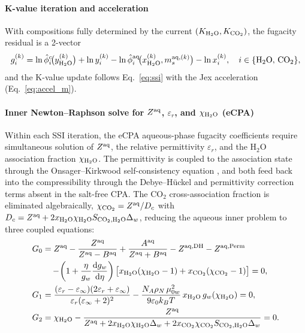 \documentclass[preprint,12pt,number]{elsarticle}
\begin{document}
\paragraph{K-value iteration and acceleration}
With compositions fully determined by the current $(K_{\rm H_2O}, K_{\rm CO_2})$, the fugacity
residual is a 2-vector
\begin{equation}
  g_i^{(k)} =
    \ln\hat{\phi}_i^{c}\!\bigl(y_{\rm H_2O}^{(k)}\bigr) + \ln y_i^{(k)}
    - \ln\hat{\phi}_i^{\rm aq}\!\bigl(x_{\rm H_2O}^{(k)}, m_s^{{\rm aq},(k)}\bigr) - \ln x_i^{(k)},
    \quad i \in \{\mathrm{H}_2\mathrm{O},\,\mathrm{CO}_2\},
  \label{eq:g_kv}
\end{equation}
and the K-value update follows Eq.~\eqref{eq:ssi} with the Jex acceleration
(Eq.~\eqref{eq:accel_m}).

\paragraph{Inner Newton--Raphson solve for $Z^{\rm aq}$, $\varepsilon_r$, and $\chi_{\rm H_2O}$ (eCPA)}
Within each SSI iteration, the eCPA aqueous-phase fugacity coefficients require
simultaneous solution of $Z^{\rm aq}$, the relative permittivity $\varepsilon_r$, and the
H$_2$O association fraction $\chi_{\rm H_2O}$.
The permittivity is coupled to the association state through the Onsager--Kirkwood
self-consistency equation \citep{MaribMogensen2015}, and both feed back into the
compressibility through the Debye--Hückel and permittivity correction terms absent
in the salt-free CPA.
The CO$_2$ cross-association fraction is eliminated algebraically,
$\chi_{\rm CO_2} = Z^{\rm aq}/D_c$ with $D_c = Z^{\rm aq} + 2x_{\rm H_2O}\chi_{\rm H_2O} S_{{\rm CO_2},{\rm H_2O}}\Delta_w$,
reducing the aqueous inner problem to three coupled equations:
\begin{align}
  G_0 &= Z^{\rm aq}
       - \frac{Z^{\rm aq}}{Z^{\rm aq} - B^{\rm aq}} + \frac{A^{\rm aq}}{Z^{\rm aq} + B^{\rm aq}} - Z^{{\rm aq},\text{DH}} - Z^{{\rm aq},\text{Perm}} 
        \nonumber \\
       &\quad  - \!\left(1 + \frac{\eta}{g_w}\frac{\mathrm{d}g_w}{\mathrm{d}\eta}\right)
         \bigl[x_{\rm H_2O}(\chi_{\rm H_2O}-1) + x_{\rm CO_2}(\chi_{\rm CO_2}-1)\bigr] = 0,
       \label{eq:G0main} \\
  G_1 &= \frac{(\varepsilon_r - \varepsilon_\infty)(2\varepsilon_r + \varepsilon_\infty)}
              {\varepsilon_r(\varepsilon_\infty + 2)^2}
       - \frac{N_A\rho_N\,\mu_{0w}^2}{9\varepsilon_0 k_BT}\,x_{\rm H_2O}\,g_w(\chi_{\rm H_2O}) = 0,
       \label{eq:G1main} \\
  G_2 &= \chi_{\rm H_2O}
       - \frac{Z^{\rm aq}}{Z^{\rm aq} + 2x_{\rm H_2O}\chi_{\rm H_2O}\Delta_w + 2x_{\rm CO_2}\chi_{\rm CO_2} S_{{\rm CO_2},{\rm H_2O}}\Delta_w} = 0.
       \label{eq:G2main}
\end{align}
\end{document}
